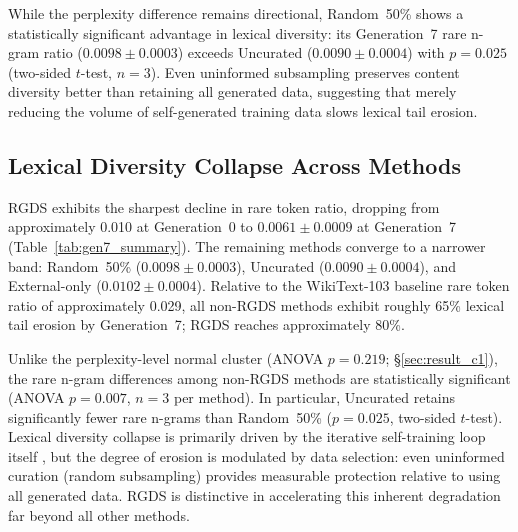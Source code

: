 While the perplexity difference remains directional, Random~50\% shows a statistically significant advantage in lexical diversity: its Generation~7 rare n-gram ratio ($0.0098 \pm 0.0003$) exceeds Uncurated ($0.0090 \pm 0.0004$) with $p = 0.025$ (two-sided $t$-test, $n{=}3$). Even uninformed subsampling preserves content diversity better than retaining all generated data, suggesting that merely reducing the volume of self-generated training data slows lexical tail erosion.

\subsection{Lexical Diversity Collapse Across Methods}
\label{sec:result_diversity}

RGDS exhibits the sharpest decline in rare token ratio, dropping from approximately 0.010 at Generation~0 to $0.0061 \pm 0.0009$ at Generation~7 (Table~\ref{tab:gen7_summary}). The remaining methods converge to a narrower band: Random~50\% ($0.0098 \pm 0.0003$), Uncurated ($0.0090 \pm 0.0004$), and External-only ($0.0102 \pm 0.0004$). Relative to the WikiText-103 baseline rare token ratio of approximately 0.029, all non-RGDS methods exhibit roughly 65\% lexical tail erosion by Generation~7; RGDS reaches approximately 80\%.

Unlike the perplexity-level normal cluster (ANOVA $p = 0.219$; \S\ref{sec:result_c1}), the rare n-gram differences among non-RGDS methods are statistically significant (ANOVA $p = 0.007$, $n{=}3$ per method). In particular, Uncurated retains significantly fewer rare n-grams than Random~50\% ($p = 0.025$, two-sided $t$-test). Lexical diversity collapse is primarily driven by the iterative self-training loop itself \citep{shumailov2024ai}, but the degree of erosion is modulated by data selection: even uninformed curation (random subsampling) provides measurable protection relative to using all generated data. RGDS is distinctive in accelerating this inherent degradation far beyond all other methods.


